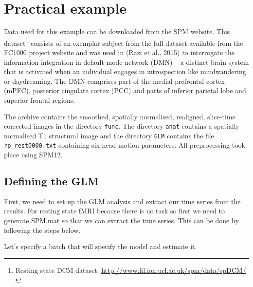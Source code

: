 \section{Practical example}

Data used for this example can be downloaded from the SPM website. This dataset\footnote{Resting state DCM dataset: \url{http://www.fil.ion.ucl.ac.uk/spm/data/spDCM/}} consists of an exemplar subject from the full dataset available from the FC1000 project website and was used in (Razi et al., 2015) to interrogate the information integration in default mode network (DMN) -- a distinct brain system that is activated when an individual engages in introspection like mindwandering or daydreaming. The DMN comprises part of the medial prefrontal cortex (mPFC), posterior cingulate cortex (PCC) and parts of inferior parietal lobe and superior frontal regions.

The archive contains the smoothed, spatially normalised, realigned, slice-time corrected images in the directory \texttt{func}. The directory \texttt{anat} contains a spatially normalised T1 structural image and the directory \texttt{GLM} contains the file \texttt{rp\_rest0000.txt} containing six head motion parameters. All preprocessing took place using SPM12.

\subsection{Defining the GLM}
First, we need to set up the GLM analysis and extract our time series from the results. For resting state fMRI because there is no task so first we need to generate SPM.mat so that we can extract the time series. This can be done by following the steps below.

Let's specify a batch that will specify the model and estimate it.

